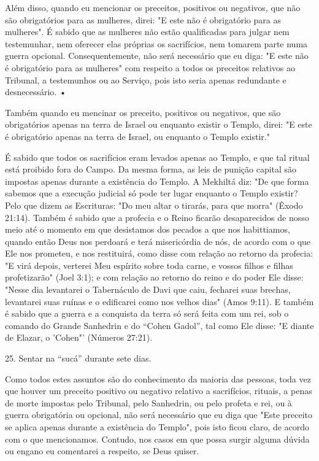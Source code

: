 Além disso, quando eu mencionar os preceitos, positivos ou negati­vos,
que não são obrigatórios para as mulheres, direi: "E este não é
obrigatório para as mulheres". É sabido que as mulheres não estão
qualificadas para julgar nem testemunhar, nem oferecer elas próprias os
sacrifícios, nem tomarem par­te numa guerra opcional. Consequentemente,
não será necessário que eu diga: "E este não é obrigatório para as
mulheres" com respeito a todos os preceitos relativos ao Tribunal, a
testemunhos ou ao Serviço, pois isto seria apenas re­dundante e
desnecessário. •

Também quando eu mencinar os preceito, positivos ou negativos, que são
obrigatórios apenas na terra de Israel ou enquanto existir o Templo,
direi: "E este é obrigatório apenas na terra de Israel, ou enquanto o
Templo existir."

É sabido que todos os sacrifícios eram levados apenas ao Templo, e que
tal ritual está proibido fora do Campo. Da mesma forma, as leis de
puni­ção capital são impostas apenas durante a existência do Templo. A
Mekhiltá diz: "De que forma sabemos que a execução judicial só pode ter
lugar enquanto o Templo existir? Pelo que dizem as Escrituras: "Do meu
altar o tirarás, para que morra" (Êxodo 21:14). Também é sabido que a
profecia e o Reino ficarão desaparecidos de nosso meio até o momento em
que desistamos dos pecados a que nos habittiamos, quando então Deus nos
perdoará e terá misericórdia de nós, de acordo com o que Ele nos
prometeu, e nos restituirá, como disse com relação ao retorno da
profecia: "E virá depois, verterei Meu espírito sobre toda carne, e
vossos filhos e filhas profetizarão" (Joel 3:1); e com relação ao
retorno do reino e do poder Ele disse: "Nesse dia levantarei o
Tabernáculo de Davi que caiu, fecharei suas brechas, levantarei suas
ruínas e o edificarei como nos ve­lhos dias" (Amos 9:11). E também é
sabido que a guerra e a conquista da terra só será feita com um rei, sob
o comando do Grande Sanhedrin e do ``Cohen Gadol'', tal como Ele disse: "E
diante de Elazar, o 'Cohen"' (Números 27:21).

25. Sentar na ``sucá'' durante sete dias.

Como todos estes assuntos são do conhecimento da maioria das pes­soas,
toda vez que houver um preceito positivo ou negativo relativo a
sacrifí­cios, rituais, a penas de morte impostas pelo Tribunal, pelo
Sanhedrin, ou pelo profeta e rei, ou à guerra obrigatória ou opcional,
não será necessário que eu diga que "Este preceito se aplica apenas
durante a existência do Templo", pois isto ficou claro, de acordo com o
que mencionamos. Contudo, nos casos em que possa surgir alguma dúvida ou
engano eu comentarei a respeito, se Deus quiser.

